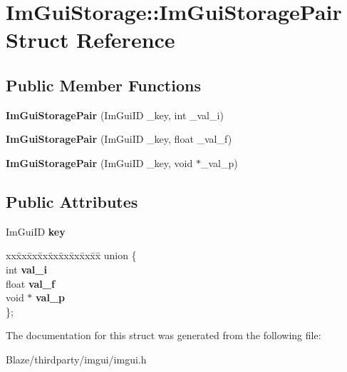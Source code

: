 \hypertarget{structImGuiStorage_1_1ImGuiStoragePair}{}\section{Im\+Gui\+Storage\+:\+:Im\+Gui\+Storage\+Pair Struct Reference}
\label{structImGuiStorage_1_1ImGuiStoragePair}
\subsection*{Public Member Functions}
\begin{DoxyCompactItemize}
\item 
\mbox{\label{structImGuiStorage_1_1ImGuiStoragePair_a8e8914f5b7b84d159ed26ff91881282d}} 
{\bfseries Im\+Gui\+Storage\+Pair} (Im\+Gui\+ID \+\_\+key, int \+\_\+val\+\_\+i)
\item 
\mbox{\label{structImGuiStorage_1_1ImGuiStoragePair_abbbe1e675db68f58be3dd5117bd9731b}} 
{\bfseries Im\+Gui\+Storage\+Pair} (Im\+Gui\+ID \+\_\+key, float \+\_\+val\+\_\+f)
\item 
\mbox{\label{structImGuiStorage_1_1ImGuiStoragePair_a20df144db4c75ceceaa69d55d12da412}} 
{\bfseries Im\+Gui\+Storage\+Pair} (Im\+Gui\+ID \+\_\+key, void $\ast$\+\_\+val\+\_\+p)
\end{DoxyCompactItemize}
\subsection*{Public Attributes}
\begin{DoxyCompactItemize}
\item 
\mbox{\label{structImGuiStorage_1_1ImGuiStoragePair_a12f78b9d0f5de30615c9493f58f69e71}} 
Im\+Gui\+ID {\bfseries key}
\item 
\mbox{\label{structImGuiStorage_1_1ImGuiStoragePair_a0a2f9dbdc4cc2f254a365345a9c141f6}} 
\begin{tabbing}
xx\=xx\=xx\=xx\=xx\=xx\=xx\=xx\=xx\=\kill
union \{\\
\>int {\bfseries val\_i}\\
\>float {\bfseries val\_f}\\
\>void $\ast$ {\bfseries val\_p}\\
\}; \\

\end{tabbing}\end{DoxyCompactItemize}


The documentation for this struct was generated from the following file\+:\begin{DoxyCompactItemize}
\item 
Blaze/thirdparty/imgui/imgui.\+h\end{DoxyCompactItemize}
